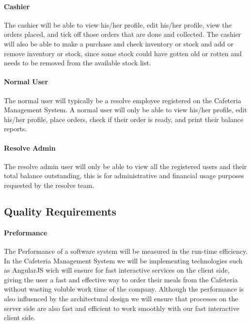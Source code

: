 \documentclass[12pt]{article}
\begin{document}
\paragraph{ Cashier\\}
The cashier will be able to view his/her profile, edit his/her profile, view the orders placed, and tick off those orders that are done and collected. The cashier will also be able to make a purchase and check inventory or stock and add or remove inventory or stock, since some stock could have gotten old or rotten and needs to be removed from the available stock list. 

\paragraph{ Normal User\\}
The normal user will typically be a resolve employee registered on the Cafeteria Management System.  A normal user will only be able to view his/her profile, edit his/her profile, place orders, check if their order is ready, and print their balance reports.

\paragraph{ Resolve Admin\\}
The resolve admin user will only be able to view all the registered users and their total balance outstanding, this is for administrative and financial usage purposes requested by the resolve team.



\subsection{Quality Requirements}

\paragraph{ Preformance\\}
The Performance of a software system will be measured in the run-time efficiency.  In the Cafeteria Management System we will be implementing technologies such as AngularJS wich will ensure for fast interactive services on the client side, giving the user a fast and effective way to order their meals from the Cafeteria without wasting voluble work time of the company.  Although the performance is also influenced by the architectural design we will ensure that processes on the server side are also fast and efficient to work smoothly with our fast interactive client side. 
\end{document}
